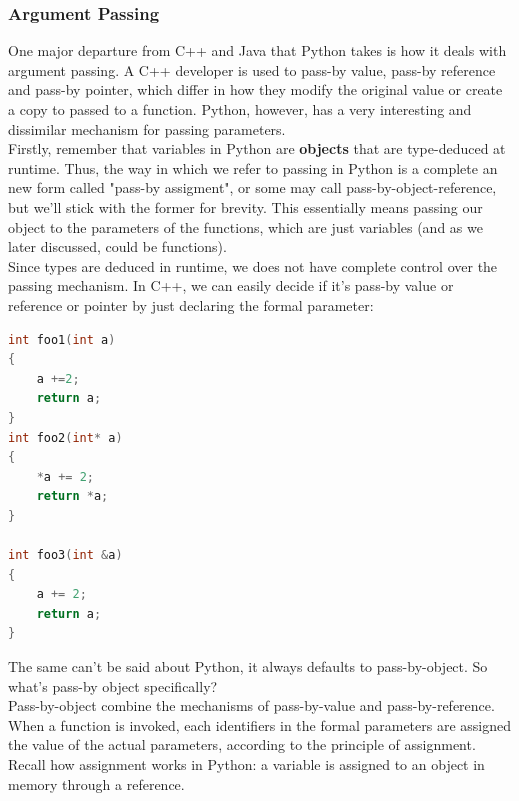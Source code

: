 \documentclass[twoside,final]{hcmut-report}
\begin{document}
\subsubsection{Argument Passing}
\hspace*{1mm} One major departure from C++ and Java that Python takes is how it deals with argument passing. A C++ developer is used to pass-by value, pass-by reference and pass-by pointer, which differ in how they modify the original value or create a copy to passed to a function. Python, however, has a very interesting and dissimilar mechanism for passing parameters. \\
\hspace*{6.5mm} Firstly, remember that variables in Python are \textbf{objects} that are type-deduced at runtime. Thus, the way in which we refer to passing in Python is a complete an new form called "pass-by assigment", or some may call pass-by-object-reference, but we'll stick with the former for brevity. This essentially means passing our object to the parameters of the functions, which are just variables (and as we later discussed, could be functions).\\
\hspace*{6.5mm} Since types are deduced in runtime, we does not have complete control over the passing mechanism. In C++, we can easily decide if it's pass-by value or reference or pointer by just declaring the formal parameter:
\begin{lstlisting}[language=C++, caption=The 3 different Argument-Passing Mechanism in C++\\ We can decide which one is suitable for our function]
int foo1(int a)
{
    a +=2;
    return a;
}
int foo2(int* a)
{
    *a += 2;
    return *a;
}

int foo3(int &a)
{
    a += 2;
    return a;
}
    \end{lstlisting}
\hspace*{6.5mm} The same can't be said about Python, it always defaults to pass-by-object. So what's pass-by object specifically?\\
\hspace*{6.5mm} Pass-by-object combine the mechanisms of pass-by-value and pass-by-reference. When a function is invoked, each identifiers in the formal parameters are assigned the value of the actual parameters, according to the principle of assignment. Recall how assignment works in Python: a variable is assigned to an object in memory through a reference.
\pagebreak


\nocite{*}
\end{document}
